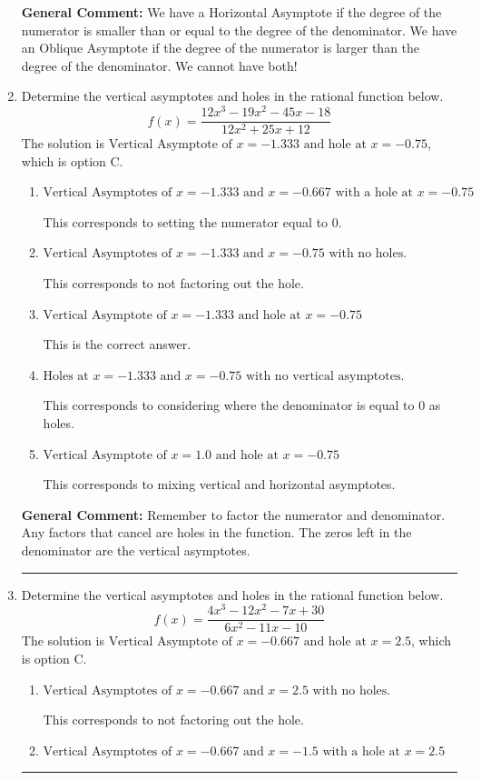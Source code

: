\documentclass{extbook}[14pt]
\newcommand{\litem}[1]{\item #1

\rule{\textwidth}{0.4pt}}
\begin{document}
\begin{enumerate}
{\textbf{General Comment:} We have a Horizontal Asymptote if the degree of the numerator is smaller than or equal to the degree of the denominator. We have an Oblique Asymptote if the degree of the numerator is larger than the degree of the denominator. We cannot have both!
}
\litem{
Determine the vertical asymptotes and holes in the rational function below.
\[ f(x) = \frac{12x^{3} -19 x^{2} -45 x -18}{12x^{2} +25 x + 12} \]The solution is \( \text{Vertical Asymptote of } x = -1.333 \text{ and hole at } x = -0.75 \), which is option C.\begin{enumerate}[label=\Alph*.]
\item \( \text{Vertical Asymptotes of } x = -1.333 \text{ and } x = -0.667 \text{ with a hole at } x = -0.75 \)

This corresponds to setting the numerator equal to 0.
\item \( \text{Vertical Asymptotes of } x = -1.333 \text{ and } x = -0.75 \text{ with no holes.} \)

This corresponds to not factoring out the hole.
\item \( \text{Vertical Asymptote of } x = -1.333 \text{ and hole at } x = -0.75 \)

This is the correct answer.
\item \( \text{Holes at } x = -1.333 \text{ and } x = -0.75 \text{ with no vertical asymptotes.} \)

This corresponds to considering where the denominator is equal to 0 as holes.
\item \( \text{Vertical Asymptote of } x = 1.0 \text{ and hole at } x = -0.75 \)

This corresponds to mixing vertical and horizontal asymptotes.
\end{enumerate}

\textbf{General Comment:} Remember to factor the numerator and denominator. Any factors that cancel are holes in the function. The zeros left in the denominator are the vertical asymptotes.
}
\litem{
Determine the vertical asymptotes and holes in the rational function below.
\[ f(x) = \frac{4x^{3} -12 x^{2} -7 x + 30}{6x^{2} -11 x -10} \]The solution is \( \text{Vertical Asymptote of } x = -0.667 \text{ and hole at } x = 2.5 \), which is option C.\begin{enumerate}[label=\Alph*.]
\item \( \text{Vertical Asymptotes of } x = -0.667 \text{ and } x = 2.5 \text{ with no holes.} \)

This corresponds to not factoring out the hole.
\item \( \text{Vertical Asymptotes of } x = -0.667 \text{ and } x = -1.5 \text{ with a hole at } x = 2.5 \)


\end{enumerate}}
\end{enumerate}
\end{document}
